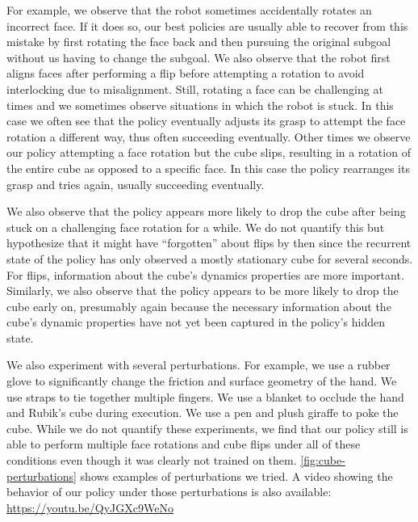 For example, we observe that the robot sometimes accidentally rotates an incorrect face. If it does so, our best policies are usually able to recover from this mistake by first rotating the face back and then pursuing the original subgoal without us having to change the subgoal. We also observe that the robot first aligns faces after performing a flip before attempting a rotation to avoid interlocking due to misalignment. Still, rotating a face can be challenging at times and we sometimes observe situations in which the robot is stuck. In this case we often see that the policy eventually adjusts its grasp to attempt the face rotation a different way, thus often succeeding eventually. Other times we observe our policy attempting a face rotation but the cube slips, resulting in a rotation of the entire cube as opposed to a specific face. In this case the policy rearranges its grasp and tries again, usually succeeding eventually.

We also observe that the policy appears more likely to drop the cube after being stuck on a challenging face rotation for a while. We do not quantify this but hypothesize that it might have ``forgotten'' about flips by then since the recurrent state of the policy has only observed a mostly stationary cube for several seconds. For flips, information about the cube's dynamics properties are more important. Similarly, we also observe that the policy appears to be more likely to drop the cube early on, presumably again because the necessary information about the cube's dynamic properties have not yet been captured in the policy's hidden state.

We also experiment with several perturbations. For example, we use a rubber glove to significantly change the friction and surface geometry of the hand. We use straps to tie together multiple fingers. We use a blanket to occlude the hand and Rubik's cube during execution. We use a pen and plush giraffe to poke the cube. While we do not quantify these experiments, we find that our policy still is able to perform multiple face rotations and cube flips under all of these conditions even though it was clearly not trained on them. \autoref{fig:cube-perturbations} shows examples of perturbations we tried. A video showing the behavior of our policy under those perturbations is also available: \mbox{\url{https://youtu.be/QyJGXc9WeNo}}

